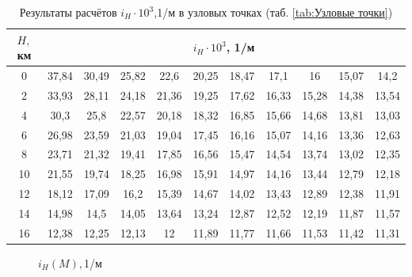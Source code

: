     \begin{table}[H]
    \centering
    \caption{Результаты расчётов $i_H \cdot 10^{3}$,1/м в узловых точках (таб. \ref{tab:Узловые точки})}
    \label{tab:Результаты расчётов $q(H,M),$Н/м$^2$}
    \begin{tabular}{|c|c|c|c|c|c|c|c|c|c|c|}
    \hline
        $H,$ км &\multicolumn{10}{|c|}{$i_H \cdot 10^{3}$, 1/м } \\ \hline
        0 & 37,84 & 30,49 & 25,82 & 22,6 & 20,25 & 18,47 & 17,1 & 16 & 15,07 & 14,2  \\ \hline
        2 & 33,93 & 28,11 & 24,18 & 21,36 & 19,25 & 17,62 & 16,33 & 15,28 & 14,38 & 13,54  \\ \hline
        4 & 30,3 & 25,8 & 22,57 & 20,18 & 18,32 & 16,85 & 15,66 & 14,68 & 13,81 & 13,03  \\ \hline
        6 & 26,98 & 23,59 & 21,03 & 19,04 & 17,45 & 16,16 & 15,07 & 14,16 & 13,36 & 12,63  \\ \hline
        8 & 23,71 & 21,32 & 19,41 & 17,85 & 16,56 & 15,47 & 14,54 & 13,74 & 13,02 & 12,35  \\ \hline
        10 & 21,55 & 19,74 & 18,25 & 16,98 & 15,91 & 14,97 & 14,16 & 13,44 & 12,79 & 12,18  \\ \hline
        12 & 18,12 & 17,09 & 16,2 & 15,39 & 14,67 & 14,02 & 13,43 & 12,89 & 12,38 & 11,91  \\ \hline
        14 & 14,98 & 14,5 & 14,05 & 13,64 & 13,24 & 12,87 & 12,52 & 12,19 & 11,87 & 11,57  \\ \hline
        16 & 12,38 & 12,25 & 12,13 & 12 & 11,89 & 11,77 & 11,66 & 11,53 & 11,42 & 11,31  \\ \hline
    \end{tabular}
\end{table}

\begin{figure}[H]
        \caption{$i_H(M), $1/м}
        \label{fig:i_H}
    \end{figure} 
    

